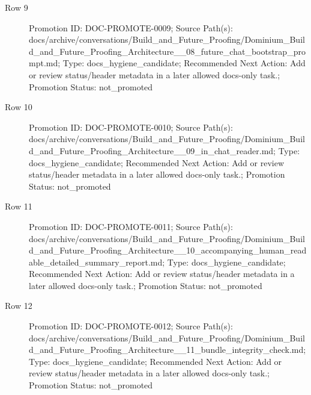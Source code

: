 \documentclass[10.5pt,a4paper,openany]{book}
\begin{document}
\begin{description}
\item[Row 9] Promotion ID: DOC-\allowbreak{}PROMOTE-\allowbreak{}0009; Source Path(s): docs/\allowbreak{}archive/\allowbreak{}conversations/\allowbreak{}Build\_\allowbreak{}and\_\allowbreak{}Future\_\allowbreak{}Proofing/\allowbreak{}Dominium\_\allowbreak{}Build\_\allowbreak{}and\_\allowbreak{}Future\_\allowbreak{}Proofing\_\allowbreak{}Architecture\_\allowbreak{}\_\allowbreak{}08\_\allowbreak{}future\_\allowbreak{}chat\_\allowbreak{}bootstrap\_\allowbreak{}prompt.\allowbreak{}md; Type: docs\_\allowbreak{}hygiene\_\allowbreak{}candidate; Recommended Next Action: Add or review status/\allowbreak{}header metadata in a later allowed docs-\allowbreak{}only task.\allowbreak{}; Promotion Status: not\_\allowbreak{}promoted
\item[Row 10] Promotion ID: DOC-\allowbreak{}PROMOTE-\allowbreak{}0010; Source Path(s): docs/\allowbreak{}archive/\allowbreak{}conversations/\allowbreak{}Build\_\allowbreak{}and\_\allowbreak{}Future\_\allowbreak{}Proofing/\allowbreak{}Dominium\_\allowbreak{}Build\_\allowbreak{}and\_\allowbreak{}Future\_\allowbreak{}Proofing\_\allowbreak{}Architecture\_\allowbreak{}\_\allowbreak{}09\_\allowbreak{}in\_\allowbreak{}chat\_\allowbreak{}reader.\allowbreak{}md; Type: docs\_\allowbreak{}hygiene\_\allowbreak{}candidate; Recommended Next Action: Add or review status/\allowbreak{}header metadata in a later allowed docs-\allowbreak{}only task.\allowbreak{}; Promotion Status: not\_\allowbreak{}promoted
\item[Row 11] Promotion ID: DOC-\allowbreak{}PROMOTE-\allowbreak{}0011; Source Path(s): docs/\allowbreak{}archive/\allowbreak{}conversations/\allowbreak{}Build\_\allowbreak{}and\_\allowbreak{}Future\_\allowbreak{}Proofing/\allowbreak{}Dominium\_\allowbreak{}Build\_\allowbreak{}and\_\allowbreak{}Future\_\allowbreak{}Proofing\_\allowbreak{}Architecture\_\allowbreak{}\_\allowbreak{}10\_\allowbreak{}accompanying\_\allowbreak{}human\_\allowbreak{}readable\_\allowbreak{}detailed\_\allowbreak{}summary\_\allowbreak{}report.\allowbreak{}md; Type: docs\_\allowbreak{}hygiene\_\allowbreak{}candidate; Recommended Next Action: Add or review status/\allowbreak{}header metadata in a later allowed docs-\allowbreak{}only task.\allowbreak{}; Promotion Status: not\_\allowbreak{}promoted
\item[Row 12] Promotion ID: DOC-\allowbreak{}PROMOTE-\allowbreak{}0012; Source Path(s): docs/\allowbreak{}archive/\allowbreak{}conversations/\allowbreak{}Build\_\allowbreak{}and\_\allowbreak{}Future\_\allowbreak{}Proofing/\allowbreak{}Dominium\_\allowbreak{}Build\_\allowbreak{}and\_\allowbreak{}Future\_\allowbreak{}Proofing\_\allowbreak{}Architecture\_\allowbreak{}\_\allowbreak{}11\_\allowbreak{}bundle\_\allowbreak{}integrity\_\allowbreak{}check.\allowbreak{}md; Type: docs\_\allowbreak{}hygiene\_\allowbreak{}candidate; Recommended Next Action: Add or review status/\allowbreak{}header metadata in a later allowed docs-\allowbreak{}only task.\allowbreak{}; Promotion Status: not\_\allowbreak{}promoted

\end{description}
\end{document}
